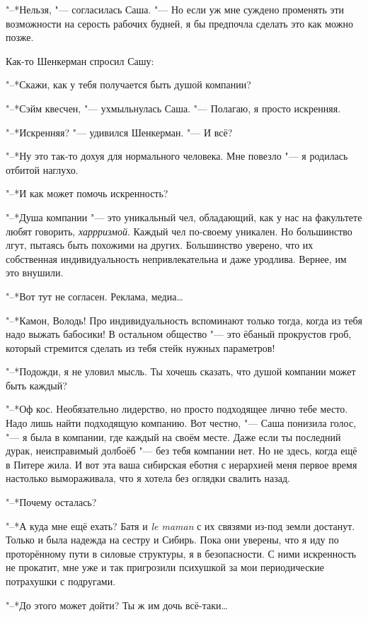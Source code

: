 "--*Нельзя, "--- согласилась Саша.
"--- Но если уж мне суждено променять эти возможности на серость рабочих будней, я бы предпочла сделать это как можно позже.

Как-то Шенкерман спросил Сашу:

"--*Скажи, как у тебя получается быть душой компании?

"--*Сэйм квесчен, "--- ухмыльнулась Саша.
"--- Полагаю, я просто искренняя.

"--*Искренняя? "--- удивился Шенкерман.
"--- И всё?

"--*Ну это так-то дохуя для нормального человека.
Мне повезло "--- я родилась отбитой наглухо.

"--*И как может помочь искренность?

"--*Душа компании "--- это уникальный чел, обладающий, как у нас на факультете любят говорить, \emph{харрризмой}.
Каждый чел по-своему уникален.
Но большинство лгут, пытаясь быть похожими на других.
Большинство уверено, что их собственная индивидуальность непривлекательна и даже уродлива.
Вернее, им это внушили.

"--*Вот тут не согласен.
Реклама, медиа\ldots{}

"--*Камон, Володь!
Про индивидуальность вспоминают только тогда, когда из тебя надо выжать бабосики!
В остальном общество "--- это ёбаный прокрустов гроб, который стремится сделать из тебя стейк нужных параметров!

"--*Подожди, я не уловил мысль.
Ты хочешь сказать, что душой компании может быть каждый?

"--*Оф кос.
Необязательно лидерство, но просто подходящее лично тебе место.
Надо лишь найти подходящую компанию.
Вот честно, "--- Саша понизила голос, "--- я была в компании, где каждый на своём месте.
Даже если ты последний дурак, неисправимый долбоёб "--- без тебя компании нет.
Но не здесь, когда ещё в Питере жила.
И вот эта ваша сибирская еботня с иерархией меня первое время настолько вымораживала, что я хотела без оглядки свалить назад.

"--*Почему осталась?

"--*А куда мне ещё ехать?
Батя и \textit{le maman} с их связями из-под земли достанут.
Только и была надежда на сестру и Сибирь.
Пока они уверены, что я иду по проторённому пути в силовые структуры, я в безопасности.
С ними искренность не прокатит, мне уже и так пригрозили психушкой за мои периодические потрахушки с подругами.

"--*До этого может дойти?
Ты ж им дочь всё-таки\ldots{}

